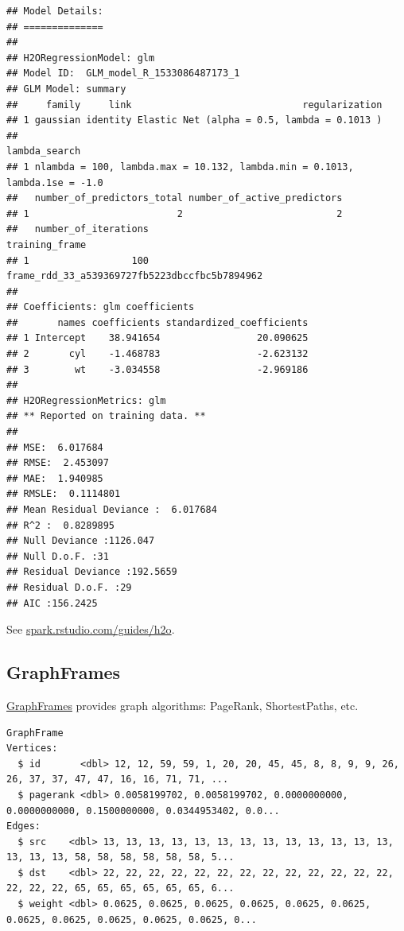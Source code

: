 \documentclass[]{book}
\newenvironment{Shaded}{\begin{snugshade}}{\end{snugshade}}
\newcommand{\DataTypeTok}[1]{\textcolor[rgb]{0.13,0.29,0.53}{#1}}
\newcommand{\FloatTok}[1]{\textcolor[rgb]{0.00,0.00,0.81}{#1}}
\newcommand{\KeywordTok}[1]{\textcolor[rgb]{0.13,0.29,0.53}{\textbf{#1}}}
\newcommand{\NormalTok}[1]{#1}
\newcommand{\OperatorTok}[1]{\textcolor[rgb]{0.81,0.36,0.00}{\textbf{#1}}}
\newcommand{\StringTok}[1]{\textcolor[rgb]{0.31,0.60,0.02}{#1}}
\theoremstyle{definition}
\theoremstyle{definition}
\theoremstyle{definition}
\theoremstyle{remark}
\begin{document}
\begin{verbatim}
## Model Details:
## ==============
## 
## H2ORegressionModel: glm
## Model ID:  GLM_model_R_1533086487173_1 
## GLM Model: summary
##     family     link                              regularization
## 1 gaussian identity Elastic Net (alpha = 0.5, lambda = 0.1013 )
##                                                                lambda_search
## 1 nlambda = 100, lambda.max = 10.132, lambda.min = 0.1013, lambda.1se = -1.0
##   number_of_predictors_total number_of_active_predictors
## 1                          2                           2
##   number_of_iterations                                training_frame
## 1                  100 frame_rdd_33_a539369727fb5223dbccfbc5b7894962
## 
## Coefficients: glm coefficients
##       names coefficients standardized_coefficients
## 1 Intercept    38.941654                 20.090625
## 2       cyl    -1.468783                 -2.623132
## 3        wt    -3.034558                 -2.969186
## 
## H2ORegressionMetrics: glm
## ** Reported on training data. **
## 
## MSE:  6.017684
## RMSE:  2.453097
## MAE:  1.940985
## RMSLE:  0.1114801
## Mean Residual Deviance :  6.017684
## R^2 :  0.8289895
## Null Deviance :1126.047
## Null D.o.F. :31
## Residual Deviance :192.5659
## Residual D.o.F. :29
## AIC :156.2425
\end{verbatim}

See
\href{http://spark.rstudio.com/guides/h2o/}{spark.rstudio.com/guides/h2o}.

\hypertarget{graphframes}{%
\subsection{GraphFrames}\label{graphframes}}

\href{https://graphframes.github.io/}{GraphFrames} provides graph
algorithms: PageRank, ShortestPaths, etc.

\begin{Shaded}
\end{Shaded}

\begin{verbatim}
GraphFrame
Vertices:
  $ id       <dbl> 12, 12, 59, 59, 1, 20, 20, 45, 45, 8, 8, 9, 9, 26, 26, 37, 37, 47, 47, 16, 16, 71, 71, ...
  $ pagerank <dbl> 0.0058199702, 0.0058199702, 0.0000000000, 0.0000000000, 0.1500000000, 0.0344953402, 0.0...
Edges:
  $ src    <dbl> 13, 13, 13, 13, 13, 13, 13, 13, 13, 13, 13, 13, 13, 13, 13, 13, 58, 58, 58, 58, 58, 58, 5...
  $ dst    <dbl> 22, 22, 22, 22, 22, 22, 22, 22, 22, 22, 22, 22, 22, 22, 22, 22, 65, 65, 65, 65, 65, 65, 6...
  $ weight <dbl> 0.0625, 0.0625, 0.0625, 0.0625, 0.0625, 0.0625, 0.0625, 0.0625, 0.0625, 0.0625, 0.0625, 0...
\end{verbatim}
\end{document}
